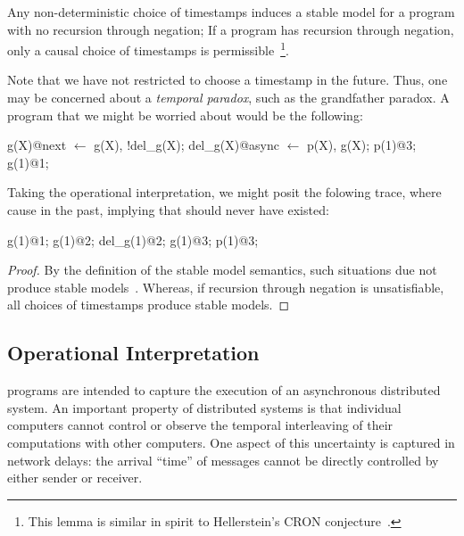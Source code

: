 
\begin{lemma}
Any non-deterministic choice of timestamps induces a stable model for a \lang program with no recursion through negation; If a \lang program has recursion through negation, only a causal choice of timestamps is permissible~\footnote{This lemma is similar in spirit to Hellerstein's CRON conjecture~\cite{declarative-imperative}.}.
\end{lemma}

Note that we have not restricted  to choose a timestamp in the future.  Thus, one may be concerned about a {\em temporal paradox}, such as the grandfather paradox.  A program that we might be worried about would be the following:

\begin{Dedalus}
g(X)@next \(\leftarrow\) g(X), !del_g(X);
del_g(X)@async \(\leftarrow\) p(X), g(X);
p(1)@3;
g(1)@1;
\end{Dedalus}

Taking the operational interpretation, we might posit the folowing trace, where  cause  in the past, implying that  should never have existed:

\begin{Dedalus}
g(1)@1;
g(1)@2;
del_g(1)@2;
g(1)@3;
p(1)@3;
\end{Dedalus}

\begin{proof}
By the definition of the stable model semantics, such situations due not produce stable models~\cite{stable-model}.  Whereas, if recursion through negation is unsatisfiable, all choices of timestamps produce stable models.
\end{proof}

\subsection{Operational Interpretation}
\lang programs are intended to capture the execution of an asynchronous distributed system.  An important property of distributed systems is that individual computers cannot control or observe the temporal interleaving of their computations with other computers.  One aspect of this uncertainty is captured in network delays: the arrival ``time'' of messages cannot be directly controlled by either sender or receiver.

